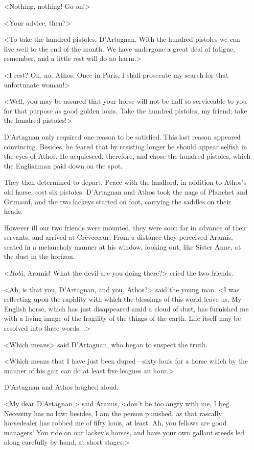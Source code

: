 <Nothing, nothing! Go on!> 

<Your advice, then?> 

<To take the hundred pistoles, D'Artagnan. With the hundred pistoles we can live well to the end of the month. We have undergone a great deal of fatigue, remember, and a little rest will do no harm.> 

<I rest? Oh, no, Athos. Once in Paris, I shall prosecute my search for that unfortunate woman!> 

<Well, you may be assured that your horse will not be half so serviceable to you for that purpose as good golden louis. Take the hundred pistoles, my friend; take the hundred pistoles!> 

D'Artagnan only required one reason to be satisfied. This last reason appeared convincing. Besides, he feared that by resisting longer he should appear selfish in the eyes of Athos. He acquiesced, therefore, and chose the hundred pistoles, which the Englishman paid down on the spot. 

They then determined to depart. Peace with the landlord, in addition to Athos's old horse, cost six pistoles. D'Artagnan and Athos took the nags of Planchet and Grimaud, and the two lackeys started on foot, carrying the saddles on their heads. 

However ill our two friends were mounted, they were soon far in advance of their servants, and arrived at Crèvecœur. From a distance they perceived Aramis, seated in a melancholy manner at his window, looking out, like Sister Anne, at the dust in the horizon. 

<\textit{Holà}, Aramis! What the devil are you doing there?> cried the two friends. 

<Ah, is that you, D'Artagnan, and you, Athos?> said the young man. <I was reflecting upon the rapidity with which the blessings of this world leave us. My English horse, which has just disappeared amid a cloud of dust, has furnished me with a living image of the fragility of the things of the earth. Life itself may be resolved into three words: .> 

<Which means\longdash> said D'Artagnan, who began to suspect the truth. 

<Which means that I have just been duped—sixty louis for a horse which by the manner of his gait can do at least five leagues an hour.> 

D'Artagnan and Athos laughed aloud. 

<My dear D'Artagnan,> said Aramis, <don't be too angry with me, I beg. Necessity has no law; besides, I am the person punished, as that rascally horsedealer has robbed me of fifty louis, at least. Ah, you fellows are good managers! You ride on our lackey's horses, and have your own gallant steeds led along carefully by hand, at short stages.> 

